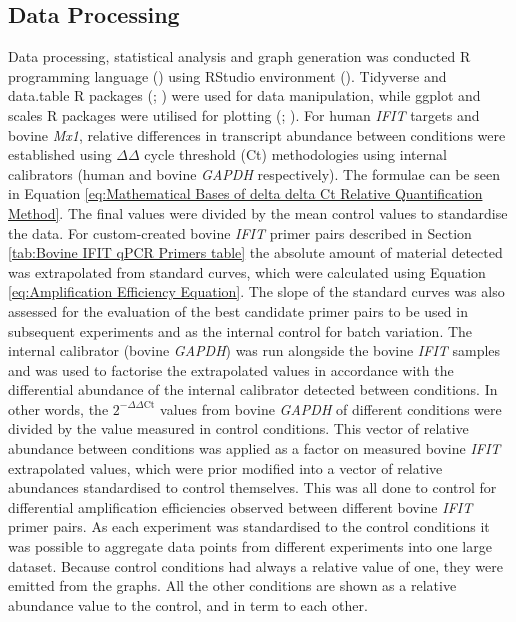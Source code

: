 \subsection{Data Processing} \label{subsec:Data Processing}
Data processing, statistical analysis and graph generation was conducted R programming language (\cite{RCoreTeam2022R:Computing}) using RStudio environment (\cite{RStudioTeam2022RStudio:RStudio}). Tidyverse and data.table R packages (\cite{Wickham2019WelcomeTidyverse}; \cite{Dowle2022Data.table:data.frame}) were used for data manipulation, while ggplot and scales R packages were utilised for plotting (\cite{Wickham2019WelcomeTidyverse}; \cite{Wickham2022Scales:Visualization}). For human \textit{IFIT} targets and bovine \textit{Mx1}, relative differences in transcript abundance between conditions were established using \(\Delta\)\(\Delta\) cycle threshold (Ct) methodologies using internal calibrators (human and bovine \textit{GAPDH} respectively). The formulae can be seen in Equation \ref{eq:Mathematical Bases of delta delta Ct Relative Quantification Method}. The final values were divided by the mean control values to standardise the data. For custom-created bovine \textit{IFIT} primer pairs described in Section \ref{tab:Bovine IFIT qPCR Primers table} the absolute amount of material detected was extrapolated from standard curves, which were calculated using Equation \ref{eq:Amplification Efficiency Equation}. The slope of the standard curves was also assessed for the evaluation of the best candidate primer pairs to be used in subsequent experiments and as the internal control for batch variation. The internal calibrator (bovine \textit{GAPDH}) was run alongside the bovine \textit{IFIT} samples and was used to factorise the extrapolated values in accordance with the differential abundance of the internal calibrator detected between conditions. In other words, the \(2^{-\Delta\Delta \mbox{Ct}}\) values from bovine \textit{GAPDH} of different conditions were divided by the value measured in control conditions. This vector of relative abundance between conditions was applied as a factor on measured bovine \textit{IFIT} extrapolated values, which were prior modified into a vector of relative abundances standardised to control themselves. This was all done to control for differential amplification efficiencies observed between different bovine \textit{IFIT} primer pairs. As each experiment was standardised to the control conditions it was possible to aggregate data points from different experiments into one large dataset. Because control conditions had always a relative value of one, they were emitted from the graphs. All the other conditions are shown as a relative abundance value to the control, and in term to each other. 

